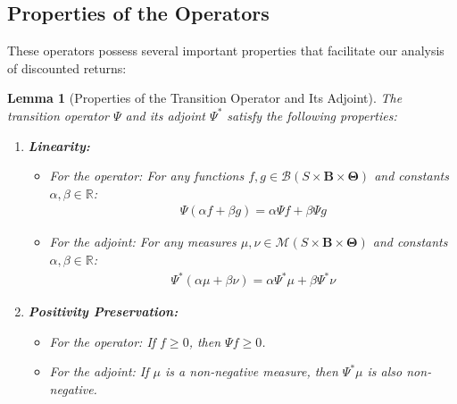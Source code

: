 \documentclass[a4paper,12pt]{report}
\newtheorem{lemma}{Lemma}
\begin{document}
\subsection{Properties of the Operators}

These operators possess several important properties that facilitate our
analysis of discounted returns:

\begin{lemma}[Properties of the Transition Operator and Its Adjoint]
    The transition operator $\Psi$ and its adjoint $\Psi^{*}$ satisfy the following
    properties:

    \begin{enumerate}
        \item \textbf{Linearity:}
              \begin{itemize}
                  \item For the operator: For any functions
                        $f, g \in \mathcal{B}(S \times \boldsymbol{B}\times \boldsymbol{\Theta}
                            )$
                        and constants $\alpha, \beta \in \mathbb{R}$:
                        \begin{align}
                            \Psi(\alpha f + \beta g) = \alpha \Psi f + \beta \Psi g
                        \end{align}

                  \item For the adjoint: For any measures
                        $\mu, \nu \in \mathcal{M}(S \times \boldsymbol{B}\times \boldsymbol{\Theta}
                            )$
                        and constants $\alpha, \beta \in \mathbb{R}$:
                        \begin{align}
                            \Psi^{*}(\alpha\mu + \beta\nu) = \alpha\Psi^{*}\mu + \beta\Psi^{*}\nu
                        \end{align}
              \end{itemize}

        \item \textbf{Positivity Preservation:}
              \begin{itemize}
                  \item For the operator: If $f \geq 0$, then $\Psi f \geq 0$.

                  \item For the adjoint: If $\mu$ is a non-negative measure, then $\Psi^{*}
                            \mu$ is also non-negative.
              \end{itemize}


\end{enumerate}
\end{lemma}
\end{document}
